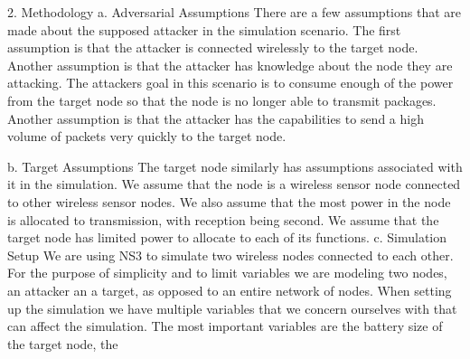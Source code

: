 2. Methodology
a. Adversarial Assumptions
	There are a few assumptions that are made about the supposed attacker in the simulation scenario.  The first assumption is that the attacker is connected wirelessly to the target node. Another assumption is that the attacker has knowledge about the node they are attacking. The attackers goal in this scenario is to consume enough of the power from the target node so that the node is no longer able to transmit packages.  Another assumption is that the attacker has the capabilities to send a high volume of packets very quickly to the target node.

b. Target Assumptions
	The target node similarly has assumptions associated with it in the simulation.  We assume that the node is a wireless sensor node connected to other wireless sensor nodes.  We also assume that the most power in the node is allocated to transmission, with reception being second.  We assume that the target node has limited power to allocate to each of its functions.  
c. Simulation Setup
	We are using NS3 to simulate two wireless nodes connected to each other. For the purpose of simplicity and to limit variables we are modeling two nodes, an attacker an a target, as opposed to an entire network of nodes. When setting up the simulation we have multiple variables that we concern ourselves with that can affect the simulation.  The most important variables are the battery size of the target node, the 